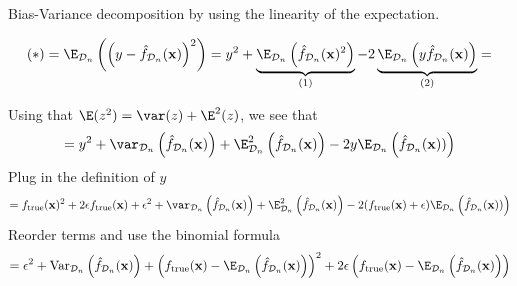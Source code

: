 \documentclass[11pt,compress,t,notes=noshow, xcolor=table]{beamer}
\begin{document}
\begin{vbframe} {Bias-Variance decomposition}
by using the linearity of the expectation.  %

\framebreak
\begin{footnotesize}
$$
(*) = \E_{\D_n}\left(\left(y - \fh_{\D_n}(\xv)\right)^2\right) = 
y^2 + \underbrace{\E_{\D_n}\left(\fh_{\D_n}(\xv)^2\right)}_{(1)}  - 2\underbrace{\E_{\D_n}\left(y\fh_{\D_n}(\xv)\right)}_{(2)} =
$$
\end{footnotesize}
\vspace{0.2cm}
\begin{footnotesize}
Using that $\E(z^2) =\var(z) + \E^2(z)$, we see that
$$
= y^2 + \var_{\D_n}\left(\fh_{\D_n}(\xv)\right) + \E^2_{\D_n}\left(\fh_{\D_n}(\xv)\right) - 2y \E_{\D_n}\left(\fh_{\D_n}(\xv))\right) 
$$
\vspace{0.2cm}
Plug in the definition of $y$
$$
 = \ftrue(\xv)^2 +2\epsilon\ftrue(\xv) + \epsilon^2 + \var_{\D_n}\left(\fh_{\D_n}(\xv)\right) + \E^2_{\D_n}\left(\fh_{\D_n}(\xv)\right) - 2 (\ftrue(\xv)+\epsilon)\E_{\D_n}\left(\fh_{\D_n}(\xv))\right) 
$$
\vspace{0.25cm}
Reorder terms and use the binomial formula
$$
= \epsilon^2 + \text{Var}_{\D_n}\left(\fh_{\D_n}(\xv)\right) + 
  \left(\ftrue(\xv) - \E_{\D_n}\left(\fh_{\D_n}(\xv)\right)\right)^2
 +2 \epsilon \left(\ftrue(\xv) - \E_{\D_n}\left(\fh_{\D_n}(\xv)\right)\right)
$$
\end{footnotesize}


\framebreak 


\end{vbframe}
\end{document}
